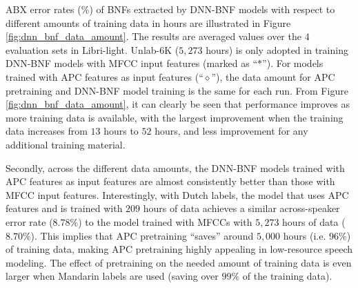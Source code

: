 \documentclass[a4paper]{article}
\begin{document}
ABX error rates ($\%$) of BNFs extracted by  DNN-BNF models with respect to different amounts of training data in hours are illustrated in Figure \ref{fig:dnn_bnf_data_amount}. The results are averaged values over the $4$ evaluation sets in  Libri-light. Unlab-6K ($5,273$ hours)  is only adopted in training DNN-BNF models with MFCC input features (marked as ``$\ast$''). For models trained with APC features as input features (``$\diamond$''), the  data amount for APC pretraining and DNN-BNF model training   is the same for each run.  From Figure \ref{fig:dnn_bnf_data_amount}, it can clearly be seen that 
performance improves as more training data is available, with the largest improvement when the training data increases from $13$  hours  to $52$ hours, and less improvement for any additional training material.

Secondly, across the different data amounts, the DNN-BNF models trained with APC features as input features are almost consistently better than those with MFCC input features. 
Interestingly, 
with Dutch labels,
the model that uses APC features and is trained with $209$ hours of data achieves a similar across-speaker error rate ($8.78\%$) to the model trained with MFCCs with $5,273$ hours of data ($8.70\%$). This implies that APC pretraining ``saves'' around $5,000$ hours (i.e.  $96\%$) of training data, making APC pretraining highly appealing in low-resource speech modeling. The effect of pretraining on the needed amount of training data is even larger when Mandarin labels are used 
(saving over $99\%$ of the training data).
\end{document}
